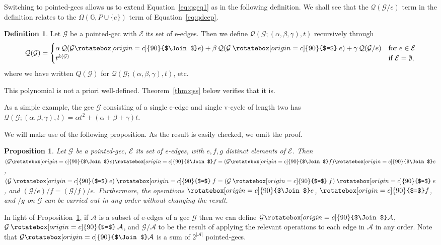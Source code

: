 \documentclass{amsart}
\newcommand{\bG}{\mathbb{G}}
\newcommand{\E}{\mathcal{E}}
\newcommand{\Q}{\mathcal{Q}}
\newcommand{\gec}[1]{\mathcal{#1}}
\newcommand{\hsplice}{\rotatebox[origin=c]{90}{$\Join$}}
\newcommand{\vsplice}{\mathbin{\rotatebox[origin=c]{90}{$=$}}}
\newtheorem{proposition}[theorem]{Proposition}
\theoremstyle{definition}
\newtheorem{definition}[theorem]{Definition}
\theoremstyle{remark}
\numberwithin{equation}{section}
\begin{document}
Switching to pointed-gecs allows us to extend Equation~\eqref{eq:qgeq1} as in the following definition. We shall see that the $\Q(\gec{G} / e)$ term in the definition relates to the $\Omega(\bG,P\cup\{e\})$ term of Equation~\eqref{eq:qdcep}.
\begin{definition}\label{def:qfull}
Let $\gec{G}$ be a pointed-gec with $\E$ its set of e-edges. Then we define $\Q(\gec{G};(\alpha,\beta, \gamma),t)$ recursively through
\begin{equation}\label{eq:qgeq2}
\Q(\gec{G}) = 
\begin{cases}
\alpha\, \Q(\gec{G} \hsplice e) +\beta \, \Q(\gec{G} \vsplice e) +\gamma \, \Q(\gec{G} / e) & \text{for $e\in \E$}\\
t^{k(\gec{G})} & \text{if $\E=\emptyset$},
\end{cases} 
\end{equation}
where we have written $Q(\gec{G})$ for $\Q(\gec{G};(\alpha,\beta, \gamma),t)$, etc.
\end{definition}
This polynomial is not a priori well-defined. Theorem~\ref{thm:qss} below verifies that it is. 

As a simple example, the gec $\gec{G}$ consisting of a single e-edge and single v-cycle of length two has   $\Q(\gec{G};(\alpha,\beta, \gamma),t)= \alpha t^2 +(\alpha+\beta+\gamma)t$.


We will make use of the following proposition. As the result is easily checked, we omit the proof.
\begin{proposition} \label{spliceorder}
Let $\gec{G}$ be a pointed-gec, $\E$ its set of e-edges, with $e,f, g$ distinct elements of $\E$. Then 
$(\gec{G}\hsplice e) \hsplice f = (\gec{G}\hsplice f) \hsplice e$,
$(\gec{G}\vsplice e) \vsplice f = (\gec{G}\vsplice f) \vsplice e$,
and 
$(\gec{G} / e) / f = (\gec{G} / f) / e$.
Furthermore, the operations $\hsplice e$, $\vsplice f$, and $/ g$ on $\gec{G}$ can be carried out in any order without changing the result.
\end{proposition}


In light of Proposition~\ref{spliceorder}, if $\gec{A}$ is a subset of e-edges of a gec $\gec{G}$ then we can define 
$\gec{G}\hsplice \gec{A}$, $\gec{G}\vsplice \gec{A}$, and $\gec{G}/ \gec{A}$ to be the result of applying the relevant operations to each edge in $\gec{A}$ in any order. Note that $\gec{G}\hsplice \gec{A}$ is a sum of $2^{|\gec{A}|}$ pointed-gecs. 
\end{document}
